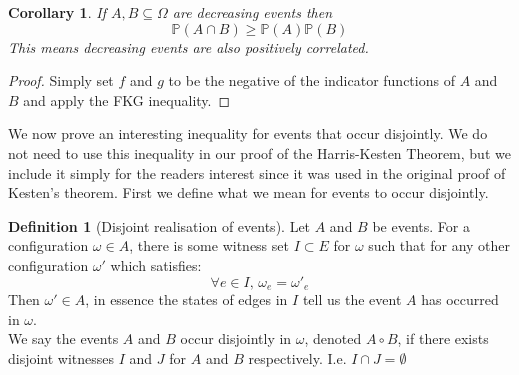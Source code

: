 \documentclass[a4paper,11pt]{article}
\newtheorem{corollary}[theorem]{Corollary}
\theoremstyle{definition}
\newtheorem{definition}[theorem]{Definition}
\begin{document}
\begin{corollary}\label{negEventsPosCorrelated}
	If $A, B \subseteq \Omega$ are decreasing events then 
	$$\mathbb{P}(A \cap B) \geq \mathbb{P}(A)\mathbb{P}(B)$$
	This means decreasing events are also positively correlated.
\end{corollary}
\begin{proof}
	Simply set $f$ and $g$ to be the negative of the indicator functions of $A$ and $B$ and apply the FKG inequality.
\end{proof}

We now prove an interesting inequality for events that occur disjointly. We do not need to use this inequality in our proof of the Harris-Kesten Theorem, but we include it simply for the readers interest since it was used in the original proof of Kesten's theorem. First we define what we mean for events to occur disjointly. 

\begin{definition}[Disjoint realisation of events]
	Let $A$ and $B$ be events. For a configuration $\omega \in A$, there is some witness set $I \subset E$ for $\omega$ such that for any other configuration $\omega'$ which satisfies:
	$$\forall e \in I \text{, } \omega_e = \omega'_e$$
	Then $\omega' \in A$, in essence the states of edges in $I$ tell us the event $A$ has occurred in $\omega$.\\
	We say the events $A$ and $B$ occur disjointly in $\omega$, denoted $A \circ B$, if there exists disjoint witnesses $I$ and $J$ for $A$ and $B$ respectively. I.e. $I \cap J = \emptyset$

\end{definition}
\end{document}
